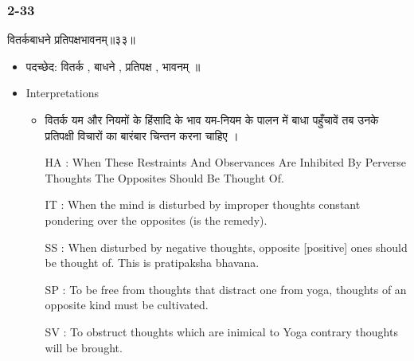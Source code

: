 \begin{frame}[fragile]\frametitle{2-33}
\begin{sanskrit}
वितर्कबाधने प्रतिपक्षभावनम्॥३३॥
\end{sanskrit}

	\begin{itemize}
	\item पदच्छेद: वितर्क , बाधने , प्रतिपक्ष , भावनम् ॥
	\item Interpretations
		\begin{itemize}
		\item वितर्क यम और नियमों के हिंसादि के भाव यम-नियम के पालन में बाधा पहुँचावें तब उनके प्रतिपक्षी विचारों का बारंबार चिन्तन करना चाहिए ।
		\item [HA]: When These Restraints And Observances Are Inhibited By Perverse Thoughts The Opposites Should Be Thought Of.
		\item [IT]: When the mind is disturbed by improper thoughts constant pondering over the opposites (is the remedy).
		\item [SS]: When disturbed by negative thoughts, opposite [positive] ones should be thought of. This is pratipaksha bhavana.
		\item [SP]: To be free from thoughts that distract one from yoga, thoughts of an opposite kind must be cultivated.
		\item [SV]: To obstruct thoughts which are inimical to Yoga contrary thoughts will be brought. 
		\end{itemize}
	\end{itemize}	
\end{frame}




